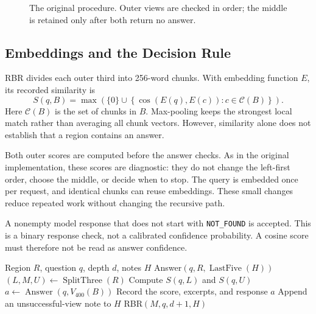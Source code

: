 \documentclass[conference]{IEEEtran}
\begin{document}
\begin{figure}[t]
\centering
\resizebox{\columnwidth}{!}{}
\caption{The original procedure. Outer views are checked in order; the middle is retained only after both return no answer.}
\label{fig:process}
\end{figure}

\subsection{Embeddings and the Decision Rule}
RBR divides each outer third into 256-word chunks. With embedding function $E$, its recorded similarity is
\begin{equation}
S(q,B)=\max\left(\{0\}\cup\left\{\cos(E(q),E(c)):c\in\mathcal C(B)\right\}\right).
\end{equation}
Here $\mathcal C(B)$ is the set of chunks in $B$. Max-pooling keeps the strongest local match rather than averaging all chunk vectors. However, similarity alone does not establish that a region contains an answer.

Both outer scores are computed before the answer checks. As in the original implementation, these scores are diagnostic: they do not change the left-first order, choose the middle, or decide when to stop. The query is embedded once per request, and identical chunks can reuse embeddings. These small changes reduce repeated work without changing the recursive path.

A nonempty model response that does not start with \texttt{NOT\_FOUND} is accepted. This is a binary response check, not a calibrated confidence probability. A cosine score must therefore not be read as answer confidence.

\begin{algorithm}[t]
\caption{Recursive Boundary Retrieval}
\begin{algorithmic}[1]
\Require Region $R$, question $q$, depth $d$, notes $H$
\State \Return Answer$(q,R,\operatorname{LastFive}(H))$
\EndIf
\State $(L,M,U)\gets\operatorname{SplitThree}(R)$
\State Compute $S(q,L)$ and $S(q,U)$
\State $a\gets\operatorname{Answer}(q,V_{400}(B))$
\State Record the score, excerpts, and response
\State \Return $a$
\EndIf
\State Append an unsuccessful-view note to $H$
\EndFor
\State \Return RBR$(M,q,d+1,H)$
\end{algorithmic}
\end{algorithm}
\end{document}

